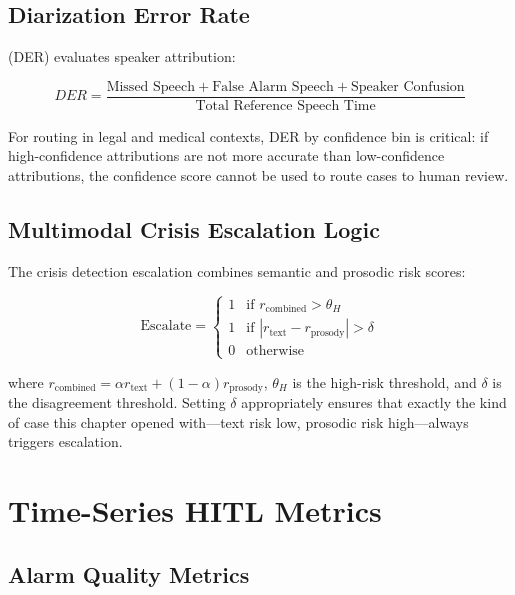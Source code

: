 \subsection{Diarization Error Rate}

 (DER) evaluates speaker attribution:

\begin{equation}
DER = \frac{\text{Missed Speech} + \text{False Alarm Speech}
            + \text{Speaker Confusion}}{\text{Total Reference Speech Time}}
\label{eq:der}
\end{equation}

For \hitl routing in legal and medical contexts, DER by confidence bin is critical: if high-confidence attributions are not more accurate than low-confidence attributions, the confidence score cannot be used to route cases to human review.

\subsection{Multimodal Crisis Escalation Logic}

The crisis detection escalation combines semantic and prosodic risk scores:

\begin{equation}
\text{Escalate} = \begin{cases}
1 & \text{if } r_{\text{combined}} > \theta_H \\
1 & \text{if } |r_{\text{text}} - r_{\text{prosody}}| > \delta \\
0 & \text{otherwise}
\end{cases}
\label{eq:crisis-escalation}
\end{equation}

where $r_{\text{combined}} = \alpha r_{\text{text}} + (1-\alpha) r_{\text{prosody}}$, $\theta_H$ is the high-risk threshold, and $\delta$ is the disagreement threshold. Setting $\delta$ appropriately ensures that exactly the kind of case this chapter opened with---text risk low, prosodic risk high---always triggers escalation.

\section{Time-Series HITL Metrics}

\subsection{Alarm Quality Metrics}

